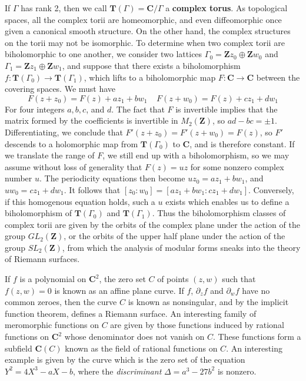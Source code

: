\begin{example}
    If $\Gamma$ has rank 2, then we call $\mathbf{T}(\Gamma) = \mathbf{C}/\Gamma$ a {\bf complex torus}. As topological spaces, all the complex torii are homeomorphic, and even diffeomorphic once given a canonical smooth structure. On the other hand, the complex structures on the torii may not be isomorphic. To determine when two complex torii are biholomorphic to one another, we consider two lattices $\Gamma_0 = \mathbf{Z} z_0 \oplus \mathbf{Z} w_0$ and $\Gamma_1 = \mathbf{Z} z_1 \oplus \mathbf{Z} w_1$, and suppose that there exists a biholomorphism $f: \mathbf{T}(\Gamma_0) \to \mathbf{T}(\Gamma_1)$, which lifts to a biholomorphic map $F: \mathbf{C} \to \mathbf{C}$ between the covering spaces. We must have
    \[ F(z + z_0) = F(z) + az_1 + bw_1\ \ \ \ \ F(z + w_0) = F(z) + cz_1 + dw_1 \]
    For four integers $a,b,c$, and $d$. The fact that $F$ is invertible implies that the matrix formed by the coefficients is invertible in $M_2(\mathbf{Z})$, so $ad - bc = \pm 1$. Differentiating, we conclude that $F'(z + z_0) = F'(z + w_0) = F(z)$, so $F'$ descends to a holomorphic map from $\mathbf{T}(\Gamma_0)$ to $\mathbf{C}$, and is therefore constant. If we translate the range of $F$, we still end up with a biholomorphism, so we may assume without loss of generality that $F(z) = uz$ for some nonzero complex number $u$. The periodicity equations then become $uz_0 = az_1 + bw_1$, and $uw_0 = cz_1 + dw_1$. It follows that $[z_0:w_0] = [az_1 + bw_1: cz_1 + dw_1]$. Conversely, if this homogenous equation holds, such a $u$ exists which enables us to define a biholomorphism of $\mathbf{T}(\Gamma_0)$ and $\mathbf{T}(\Gamma_1)$. Thus the biholomorphism classes of complex torii are given by the orbits of the complex plane under the action of the group $GL_2(\mathbf{Z})$, or the orbits of the upper half plane under the action of the group $SL_2(\mathbf{Z})$, from which the analysis of modular forms sneaks into the theory of Riemann surfaces.
\end{example}

\begin{example}
    If $f$ is a polynomial on $\mathbf{C}^2$, the zero set $C$ of points $(z,w)$ such that $f(z,w) = 0$ is known as an affine plane curve. If $f$, $\partial_z f$ and $\partial_w f$ have no common zeroes, then the curve $C$ is known as nonsingular, and by the implicit function theorem, defines a Riemann surface. An interesting family of meromorphic functions on $C$ are given by those functions induced by rational functions on $\mathbf{C}^2$ whose denominator does not vanish on $C$. These functions form a subfield $\mathbf{C}(C)$ known as the field of rational functions on $C$. An interesting example is given by the curve which is the zero set of the equation $Y^2 = 4X^3 - aX - b$, where the {\it discriminant} $\Delta = a^3 - 27b^2$ is nonzero.
\end{example}

